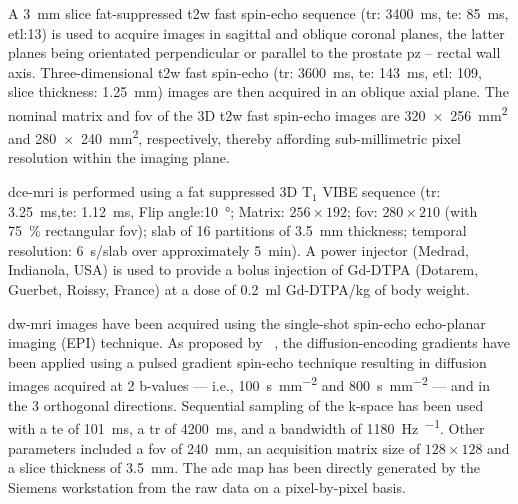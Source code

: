 A \SI{3}{\mm} slice fat-suppressed \ac{t2w} fast spin-echo sequence (\ac{tr}: \SI{3400}{\ms}, \ac{te}: \SI{85}{\ms}, \ac{etl}:13) is used to acquire images in sagittal and oblique coronal planes, the latter planes being orientated perpendicular or parallel to the prostate \ac{pz} – rectal wall axis.
Three-dimensional \ac{t2w} fast spin-echo (\ac{tr}: \SI{3600}{\ms}, \ac{te}: \SI{143}{\ms}, \ac{etl}: 109, slice thickness: \SI{1.25}{\mm}) images are then acquired in an oblique axial plane.
The nominal matrix and \ac{fov} of the 3D \ac{t2w} fast spin-echo images are \SI[product-units=repeat]{320x256}{\milli\metre\squared} and \SI[product-units=repeat]{280x240}{\milli\metre\squared}, respectively, thereby affording sub-millimetric pixel resolution within the imaging plane.

\ac{dce}-\ac{mri} is performed using a fat suppressed 3D T$_1$ VIBE sequence (\ac{tr}: \SI{3.25}{\ms},\ac{te}: \SI{1.12}{\ms}, Flip angle:\SI{10}{\degree}; Matrix: $256 \times 192$; \ac{fov}: $280 \times 210$ (with \SI{75}{\percent} rectangular \ac{fov}); slab of 16 partitions of \SI{3.5}{\mm} thickness; temporal resolution: \SI{6}{\s}/slab over approximately \SI{5}{\minute}).
A power injector (Medrad, Indianola, USA) is used to provide a bolus injection of Gd-DTPA (Dotarem, Guerbet, Roissy, France) at a dose of \SI{0.2}{\ml} Gd-DTPA/kg of body weight.

\ac{dw}-\ac{mri} images have been acquired using the single-shot spin-echo echo-planar imaging (EPI) technique.
As proposed by \citeauthor{stejskal1965spin}~\cite{stejskal1965spin}, the diffusion-encoding gradients have been applied using a pulsed gradient spin-echo technique resulting in diffusion images acquired at 2 b-values --- i.e., \SI{100}{\second\per\milli\meter\squared} and \SI{800}{\second\per\milli\meter\squared} --- and in the 3 orthogonal directions.
Sequential sampling of the k-space has been used with a \ac{te} of \SI{101}{\ms}, a \ac{tr} of \SI{4200}{\ms}, and a bandwidth of \SI{1180}{\hertz\per\px}.
Other parameters included a \ac{fov} of \SI{240}{\milli\metre}, an acquisition matrix size of $128 \times 128$ and a slice thickness of \SI{3.5}{\milli\metre}.
The \ac{adc} map has been directly generated by the Siemens workstation from the raw data on a pixel-by-pixel basis.

